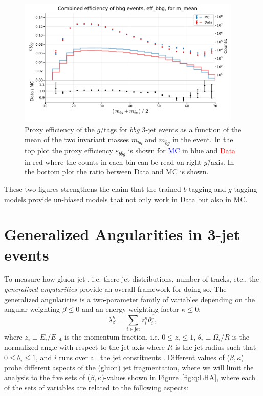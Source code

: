 \begin{figure}[h!]
  \centerfloat
  \includegraphics[width=0.95\textwidth, trim=0 0 0 40, clip]{figures/quarks/eff_bbg_m_mean-down_sample=1.00-ML_vars=vertex-selection=b-ejet_min=4-n_iter_RS_lgb=99-n_iter_RS_xgb=9-cdot_cut=0.90-version=19.pdf}
  \caption[$g$\=/Tagging Proxy Efficiency for $b\bar{b}g$\=/Events as a Function of The Mean Invariant Mass]
          {Proxy efficiency of the $g$\=/tags for $b\bar{b}g$ 3-jet events as a function of the mean of the two invariant masses $m_{bg}$ and $m_{\bar{b}g}$ in the event. In the top plot the proxy efficiency $\varepsilon_{b\bar{b}g}$ is shown for \textcolor{blue}{MC} in blue and \textcolor{red}{Data} in red where the counts in each bin can be read on right $y$\=/axis. In the bottom plot the ratio between Data and MC is shown.} 
  \label{fig:q:effiency_btag_bbg_m_mean}
\end{figure}

These two figures strengthens the claim that the trained $b$-tagging and $g$-tagging models provide un-biased models that not only work in Data but also in MC. 

\section{Generalized Angularities in 3-jet events}
\label{sec:q:generalized_angularities}

To measure how gluon jet , i.e. there jet distributions, number of tracks, etc., the \emph{generalized angularities} provide an overall framework for doing so. The generalized angularities is a two-parameter family of variables depending on the angular weighting $\beta \leq 0$ and an energy weighting factor $\kappa \leq 0$:
\begin{equation}
  \lambda_\beta^\kappa = \sum_{i \in \mathrm{jet}} z_i^\kappa \theta_i^\beta,
\end{equation}
where $z_i \equiv E_i / E_\mathrm{jet}$ is the momentum fraction, i.e. $0 \leq z_i \leq 1$, $\theta_i \equiv \Omega_i / R$ is the normalized angle with respect to the jet axis where $R$ is the jet radius such that $0 \leq \theta_i \leq 1$, and $i$ runs over all the jet constituents \citep{grasSystematicsQuarkGluon2017,larkoskiGainingMutualInformation2014}. Different values of ($\beta, \kappa$) probe different aspects of the (gluon) jet fragmentation, where we will limit the analysis to the five sets of ($\beta, \kappa$)-values shown in Figure~\ref{fig:q:LHA}, where each of the sets of variables are related to the following aspects:

